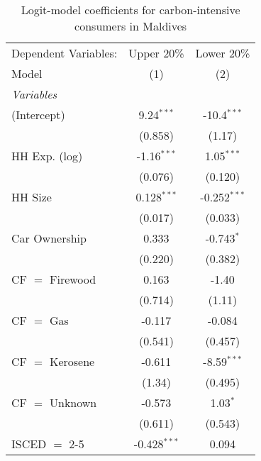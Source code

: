 
\begin{table}[htbp!]
   \centering
   \small
   \begin{adjustbox}{width = 1\textwidth, max height = 0.95\textheight, center}
      \begin{threeparttable}[b]
         \caption{\label{tab:Logit_1_MDV} Logit-model coefficients for carbon-intensive consumers in Maldives}
         \begin{tabular}{lcc}
            \tabularnewline \midrule \midrule
            Dependent Variables: & Upper 20\%     & Lower 20\%\\   
            Model                & (1)            & (2)\\  
            \midrule
            \emph{Variables}\\
            (Intercept)          & 9.24$^{***}$   & -10.4$^{***}$\\   
                                 & (0.858)        & (1.17)\\   
            HH Exp. (log)        & -1.16$^{***}$  & 1.05$^{***}$\\   
                                 & (0.076)        & (0.120)\\   
            HH Size              & 0.128$^{***}$  & -0.252$^{***}$\\   
                                 & (0.017)        & (0.033)\\   
            Car Ownership        & 0.333          & -0.743$^{*}$\\   
                                 & (0.220)        & (0.382)\\   
            CF $=$ Firewood      & 0.163          & -1.40\\   
                                 & (0.714)        & (1.11)\\   
            CF $=$ Gas           & -0.117         & -0.084\\   
                                 & (0.541)        & (0.457)\\   
            CF $=$ Kerosene      & -0.611         & -8.59$^{***}$\\   
                                 & (1.34)         & (0.495)\\   
            CF $=$ Unknown       & -0.573         & 1.03$^{*}$\\   
                                 & (0.611)        & (0.543)\\   
            ISCED $=$ 2-5        & -0.428$^{***}$ & 0.094\\   

\end{tabular}
\end{threeparttable}
\end{adjustbox}
\end{table}

